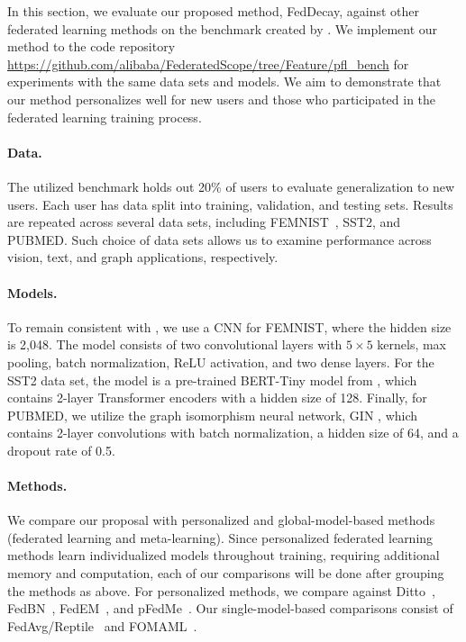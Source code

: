 \documentclass{article}
\begin{document}
In this section, we evaluate our proposed method, FedDecay, against other federated learning methods on the benchmark created by \cite{pfl-bench}.
We implement our method to the code repository \url{https://github.com/alibaba/FederatedScope/tree/Feature/pfl_bench} for experiments with the same data sets and models.
We aim to demonstrate that our method personalizes well for new users and those who participated in the federated learning training process.


\paragraph{Data.} 
The utilized benchmark holds out 20\% of users to evaluate generalization to new users.
Each user has data split into training, validation, and testing sets.
Results are repeated across several data sets, including FEMNIST~\citep{femnist}, SST2, and PUBMED.
Such choice of data sets allows us to examine performance across vision, text, and graph applications, respectively.


\paragraph{Models.} 
To remain consistent with \cite{pfl-bench}, we use a CNN for FEMNIST, where the hidden size is 2,048. 
The model consists of two convolutional layers with $5\times 5$ kernels, max pooling, batch normalization, ReLU activation, and two dense layers. 
For the SST2 data set, the model is a pre-trained BERT-Tiny model from \cite{model-sst2}, which contains 2-layer Transformer encoders with a hidden size of 128.
Finally, for PUBMED, we utilize the graph isomorphism neural network, GIN \citep{model-pubmed}, which contains 2-layer convolutions with batch normalization, a hidden size of 64, and a dropout rate of 0.5. 


\paragraph{Methods.} 
We compare our proposal with personalized and global-model-based methods (federated learning and meta-learning).
Since personalized federated learning methods learn individualized models throughout training, requiring additional memory and computation, each of our comparisons will be done after grouping the methods as above.
For personalized methods, we compare against Ditto~\citep{ditto}, FedBN~\citep{fedbn}, FedEM~\citep{fedem}, and pFedMe~\citep{pfedme}.
Our single-model-based comparisons consist of FedAvg/Reptile~\citep{fedavg, reptile} and FOMAML~\citep{reptile}.
\end{document}
